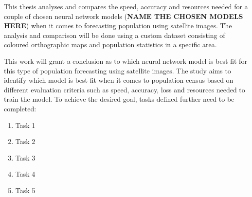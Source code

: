 This thesis analyses and compares the speed, accuracy and resources needed for a couple of chosen neural network models (\textbf{NAME THE CHOSEN MODELS HERE}) when it comes to forecasting population using satellite images. The analysis and comparison will be done using a custom dataset consisting of coloured orthographic maps and population statistics in a specific area.

This work will grant a conclusion as to which neural network model is best fit for this type of population forecasting using satellite images. The study aims to identify which model is best fit when it comes to population census based on different evaluation criteria such as speed, accuracy, loss and resources needed to train the model. To achieve the desired goal, tasks defined further need to be completed:
\begin{enumerate}
    \item Task 1
    \item Task 2
    \item Task 3
    \item Task 4
    \item Task 5
\end{enumerate}
